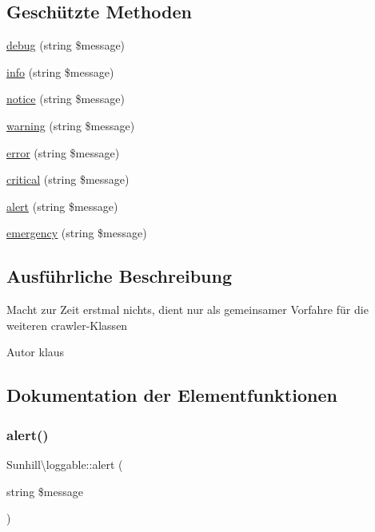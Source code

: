 \subsection*{Geschützte Methoden}
\begin{DoxyCompactItemize}
\item 
\hyperlink{classSunhill_1_1loggable_a78bfb6928b9f2f4ee5aa68fb451d7408}{debug} (string \$message)
\item 
\hyperlink{classSunhill_1_1loggable_aa0deed89a9fc6577c506482942ca7ab0}{info} (string \$message)
\item 
\hyperlink{classSunhill_1_1loggable_a78bf02f8f917699e002e049f2c4b9f05}{notice} (string \$message)
\item 
\hyperlink{classSunhill_1_1loggable_aadafede5632bc9836099dec3f70ce88a}{warning} (string \$message)
\item 
\hyperlink{classSunhill_1_1loggable_ae521541f9ebaa50bcb42ecb6f5b4b3de}{error} (string \$message)
\item 
\hyperlink{classSunhill_1_1loggable_a4e265d03fd6d7a4a1f56b88bcd1e79d7}{critical} (string \$message)
\item 
\hyperlink{classSunhill_1_1loggable_a5462917a7848d41e77006a53c223ca0e}{alert} (string \$message)
\item 
\hyperlink{classSunhill_1_1loggable_a7cef01f358c34087f62b4b74b81879ef}{emergency} (string \$message)
\end{DoxyCompactItemize}


\subsection{Ausführliche Beschreibung}
Macht zur Zeit erstmal nichts, dient nur als gemeinsamer Vorfahre für die weiteren crawler-\/\+Klassen \begin{DoxyAuthor}{Autor}
klaus 
\end{DoxyAuthor}


\subsection{Dokumentation der Elementfunktionen}
\mbox{\label{classSunhill_1_1loggable_a5462917a7848d41e77006a53c223ca0e}} 
\subsubsection{\texorpdfstring{alert()}{alert()}}
{\footnotesize\ttfamily Sunhill\textbackslash{}loggable\+::alert (\begin{DoxyParamCaption}\item[{string}]{\$message }\end{DoxyParamCaption})\hspace{0.3cm}{\ttfamily [protected]}}

